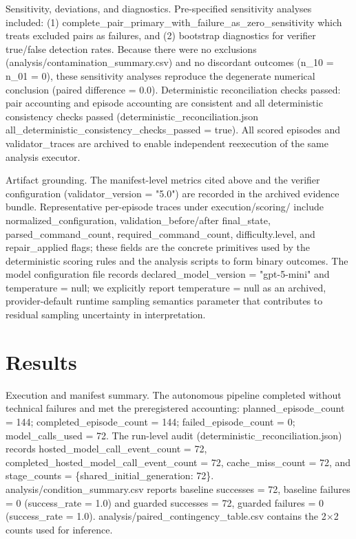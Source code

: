 \documentclass[conference]{IEEEtran}
\begin{document}
Sensitivity, deviations, and diagnostics. Pre-specified sensitivity analyses included: (1) complete\_pair\_primary\_with\_failure\_as\_zero\_sensitivity which treats excluded pairs as failures, and (2) bootstrap diagnostics for verifier true/false detection rates. Because there were no exclusions (analysis/contamination\_summary.csv) and no discordant outcomes (n\_10 = n\_01 = 0), these sensitivity analyses reproduce the degenerate numerical conclusion (paired difference = 0.0). Deterministic reconciliation checks passed: pair accounting and episode accounting are consistent and all deterministic consistency checks passed (deterministic\_reconciliation.json all\_deterministic\_consistency\_checks\_passed = true). All scored episodes and validator\_traces are archived to enable independent reexecution of the same analysis executor.

Artifact grounding. The manifest-level metrics cited above and the verifier configuration (validator\_version = "5.0") are recorded in the archived evidence bundle. Representative per-episode traces under execution/scoring/ include normalized\_configuration, validation\_before/after final\_state, parsed\_command\_count, required\_command\_count, difficulty.level, and repair\_applied flags; these fields are the concrete primitives used by the deterministic scoring rules and the analysis scripts to form binary outcomes. The model configuration file records declared\_model\_version = "gpt-5-mini" and temperature = null; we explicitly report temperature = null as an archived, provider-default runtime sampling semantics parameter that contributes to residual sampling uncertainty in interpretation.

\section{Results}
Execution and manifest summary. The autonomous pipeline completed without technical failures and met the preregistered accounting: planned\_episode\_count = 144; completed\_episode\_count = 144; failed\_episode\_count = 0; model\_calls\_used = 72. The run-level audit (deterministic\_reconciliation.json) records hosted\_model\_call\_event\_count = 72, completed\_hosted\_model\_call\_event\_count = 72, cache\_miss\_count = 72, and stage\_counts = \{shared\_initial\_generation: 72\}. analysis/condition\_summary.csv reports baseline successes = 72, baseline failures = 0 (success\_rate = 1.0) and guarded successes = 72, guarded failures = 0 (success\_rate = 1.0). analysis/paired\_contingency\_table.csv contains the 2\ensuremath{\times}2 counts used for inference.
\end{document}
